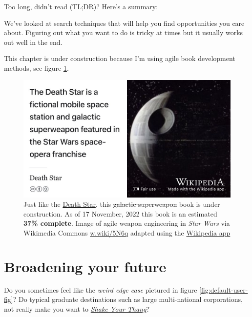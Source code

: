 \documentclass[
]{book}
\begin{document}
\href{https://en.wiktionary.org/wiki/too_long;_didn\%27t_read}{Too long, didn't read} (TL;DR)? Here's a summary:

We've looked at search techniques that will help you find opportunities you care about. Figuring out what you want to do is tricky at times but it usually works out well in the end.

This chapter is under construction because I'm using agile book development methods, see figure \ref{fig:deathstar5-fig}.

\begin{figure}

{\centering \includegraphics[width=0.99\linewidth]{images/DeathStar2} 

}

\caption{Just like the \href{https://en.wikipedia.org/wiki/Death_Star}{Death Star}, this \sout{galactic superweapon} book is under construction. As of 17 November, 2022 this book is an estimated \textbf{37\% complete}. Image of agile weapon engineering in \emph{Star Wars} via Wikimedia Commons \href{https://w.wiki/5N6q}{w.wiki/5N6q} adapted using the \href{https://apps.apple.com/gb/app/wikipedia/id324715238}{Wikipedia app}}\label{fig:deathstar5-fig}
\end{figure}

\hypertarget{broadening}{%
\chapter{Broadening your future}\label{broadening}}

Do you sometimes feel like the \emph{weird edge case} pictured in figure \ref{fig:default-user-fig}? Do typical graduate destinations such as large multi-national corporations, not really make you want to \emph{\href{https://en.wikipedia.org/wiki/Shake_Your_Thang}{Shake Your Thang}}? \citep{saltnpepa}
\end{document}
